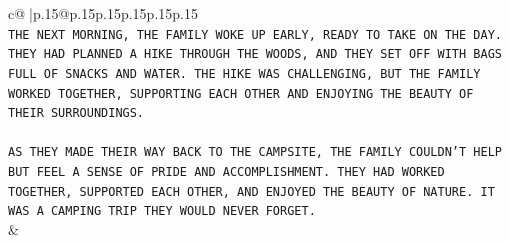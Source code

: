 \documentclass{article}
\begin{document}
{\begin{supertabular}{c@{$\;$}|p{.15\linewidth}@{}p{.15\linewidth}p{.15\linewidth}p{.15\linewidth}p{.15\linewidth}p{.15\linewidth}}
{{{\\ 
\texttt{THE NEXT MORNING, THE FAMILY WOKE UP EARLY, READY TO TAKE ON THE DAY. THEY HAD PLANNED A HIKE THROUGH THE WOODS, AND THEY SET OFF WITH BAGS FULL OF SNACKS AND WATER. THE HIKE WAS CHALLENGING, BUT THE FAMILY WORKED TOGETHER, SUPPORTING EACH OTHER AND ENJOYING THE BEAUTY OF THEIR SURROUNDINGS.} \\
\\ 
\texttt{AS THEY MADE THEIR WAY BACK TO THE CAMPSITE, THE FAMILY COULDN'T HELP BUT FEEL A SENSE OF PRIDE AND ACCOMPLISHMENT. THEY HAD WORKED TOGETHER, SUPPORTED EACH OTHER, AND ENJOYED THE BEAUTY OF NATURE. IT WAS A CAMPING TRIP THEY WOULD NEVER FORGET.} \\
            }
        }
    }
    & \\ \\


\end{supertabular}}
\end{document}
